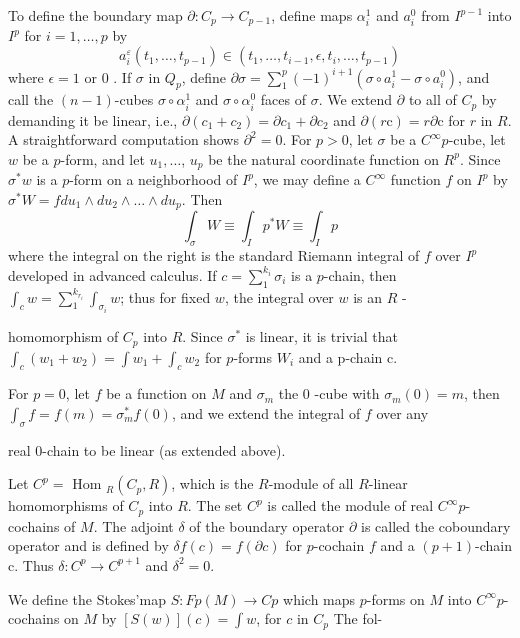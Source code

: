 \documentclass[10pt]{article}
\begin{document}
To define the boundary map $\partial: C_{p} \rightarrow C_{p-1}$, define maps $\alpha_{i}^{1}$ and $a_{i}^{0}$ from $I^{p-1}$ into $I^{p}$ for $i=1, \ldots, p$ by
$$
a_{i}^{\varepsilon}\left(t_{1}, \ldots, t_{p-1}\right) \in\left(t_{1}, \ldots, t_{i-1}, \epsilon, t_{i}, \ldots, t_{p-1}\right)
$$
where $\epsilon=1$ or 0 . If $\sigma$ in $Q_{p}$, define $\partial \sigma=\sum_{1}^{p}(-1)^{i+1}\left(\sigma \circ a_{i}^{1}-\sigma \circ a_{i}^{0}\right)$, and call the $(n-1)$-cubes $\sigma \circ \alpha_{i}^{1}$ and $\sigma \circ \alpha_{i}^{0}$ faces of $\sigma .$ We extend $\partial$ to all of $C_{p}$ by demanding it be linear, i.e., $\partial\left(c_{1}+c_{2}\right)=\partial c_{1}+\partial c_{2}$ and $\partial(r \mathrm{c})=r \partial \mathrm{c}$ for $r$ in $R$. A straightforward computation shows $\partial^{2}=0$. For $p>0$, let $\sigma$ be a $C^{\infty} p$-cube, let $w$ be a $p$-form, and let $u_{1}, \ldots$, $u_{p}$ be the natural coordinate function on $R^{p}$. Since $\sigma^{*} w$ is a $p$-form on a neighborhood of $I^{p}$, we may define a $C^{\infty}$ function $f$ on $I^{p}$ by $\sigma^{*} W=f d u_{1} \wedge d u_{2} \wedge \ldots \wedge d u_{p}$. Then
$$
\int_{\sigma} W \equiv \int_{I} p^{*} W \equiv \int_{I} p
$$
where the integral on the right is the standard Riemann integral of $f$ over $I^{p}$ developed in advanced calculus. If $c=\sum_{1}^{k_{i}} \sigma_{i}$ is a $p$-chain, then $\int_{c} w=\sum_{1}^{k_{r_{i}}} \int_{\sigma_{i}} w$; thus for fixed $w$, the integral over $w$ is an $R$ -

homomorphism of $C_{p}$ into $R$. Since $\sigma^{*}$ is linear, it is trivial that $\int_{c}\left(w_{1}+w_{2}\right)=\int w_{1}+\int_{c} w_{2}$ for $p$-forms $W_{i}$ and a p-chain c.

For $p=0$, let $f$ be a function on $M$ and $\sigma_{m}$ the 0 -cube with $\sigma_{m}(0)=m$, then $\int_{\sigma} f=f(m)=\sigma_{m}^{*} f(0)$, and we extend the integral of $f$ over any

real 0-chain to be linear (as extended above).

Let $C^{p}=$ Hom $_{R}\left(C_{p}, R\right)$, which is the $R$-module of all $R$-linear homomorphisms of $C_{p}$ into $R$. The set $C^{p}$ is called the module of real $C^{\infty} p$-cochains of $M$. The adjoint $\delta$ of the boundary operator $\partial$ is called the coboundary operator and is defined by $\delta f(c)=f(\partial c)$ for $p$-cochain $f$ and a $(p+1)$-chain c. Thus $\delta: C^{p} \rightarrow C^{p+1}$ and $\delta^{2}=0$.

We define the Stokes'map $S: F p(M) \rightarrow C p$ which maps $p$-forms on $M$ into $C^{\infty} p$-cochains on $M$ by $[S(w)](c)=\int w$, for $c$ in $C_{p}$ The fol-
\end{document}
